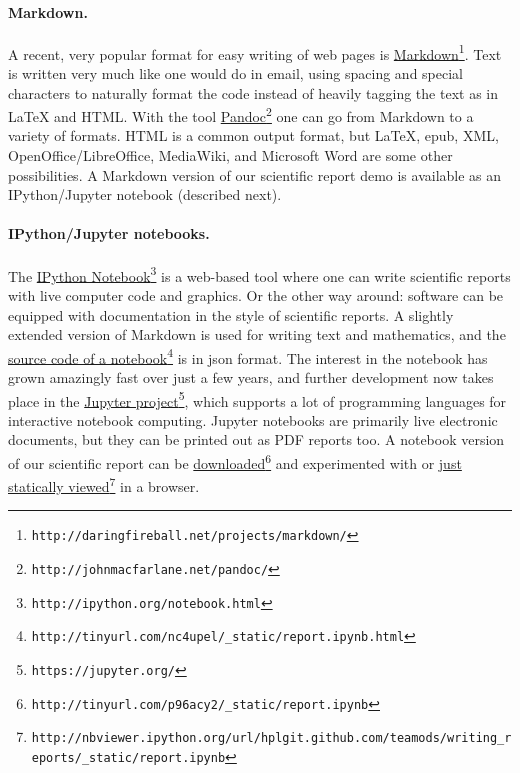 \documentclass[graybox,sectrefs,envcountresetchap,open=right,final]{svmonodo}
\begin{document}
\paragraph{Markdown.}
A recent, very popular format for easy writing of web pages is
\href{{http://daringfireball.net/projects/markdown/}}{Markdown}\footnote{\texttt{http://daringfireball.net/projects/markdown/}}.
Text is written very much like one would do in email, using
spacing and special characters to naturally format the code
instead of heavily tagging the text as in {\LaTeX} and HTML.
With the tool \href{{http://johnmacfarlane.net/pandoc/}}{Pandoc}\footnote{\texttt{http://johnmacfarlane.net/pandoc/}} one
can go from Markdown to a variety of formats.
HTML is a common output format, but {\LaTeX}, epub, XML,
OpenOffice/LibreOffice, MediaWiki, and Microsoft Word are some other
possibilities. A Markdown version of our scientific
report demo is available as an IPython/Jupyter notebook (described next).


\paragraph{IPython/Jupyter notebooks.}
The \href{{http://ipython.org/notebook.html}}{IPython Notebook}\footnote{\texttt{http://ipython.org/notebook.html}} is
a web-based tool where one can write scientific reports with live computer
code and graphics. Or the other way around: software can be equipped
with documentation in the style of scientific reports.
A slightly extended version of Markdown is used for writing text and
mathematics, and the \href{{http://tinyurl.com/nc4upel/_static/report.ipynb.html}}{source code of a notebook}\footnote{\texttt{http://tinyurl.com/nc4upel/\_static/report.ipynb.html}} is in json format.
The interest in the notebook has grown amazingly fast
over just a few years, and further development now takes place
in the \href{{https://jupyter.org/}}{Jupyter project}\footnote{\texttt{https://jupyter.org/}}, which
supports a lot of programming languages for interactive notebook computing.
Jupyter notebooks are primarily live electronic documents, but they can be
printed out as PDF reports too.
A notebook version of our scientific report can be \href{{http://tinyurl.com/p96acy2/_static/report.ipynb}}{downloaded}\footnote{\texttt{http://tinyurl.com/p96acy2/\_static/report.ipynb}} and experimented with
or \href{{http://nbviewer.ipython.org/url/hplgit.github.com/teamods/writing_reports/_static/report.ipynb}}{just statically viewed}\footnote{\texttt{http://nbviewer.ipython.org/url/hplgit.github.com/teamods/writing\_reports/\_static/report.ipynb}} in a browser.
\end{document}
